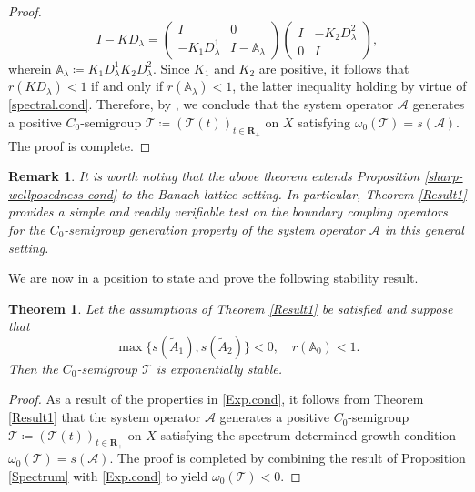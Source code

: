 \documentclass[a4paper,11pt,reqno]{amsart}
\def\A{{\mathbb{A}}}
\def\la{\lambda}
\def\calT{{\mathcal{T}}}
\def\calA{{\mathcal{A}}}
\def\R{\mathbf{R}}
\newtheorem{theorem}{Theorem}[section]
\theoremstyle{plain}
\newtheorem{remark}{Remark}[section]
\numberwithin{equation}{section}
\begin{document}
\begin{proof}
\begin{equation*}
I-K D_\la=\left( \begin{matrix}
I & 0\\
-K_1 D_\la^1 & I-\A_\la
\end{matrix}\right)\left(\begin{matrix}
I & -K_2 D_\la^2\\
0& I
\end{matrix}\right),
\end{equation*} 
wherein $\mathbb{A}_\lambda \coloneqq K_1 D_\lambda^1 K_2 D_\lambda^2$. Since $K_1$ and $K_2$ are positive, it follows that $r(K D_\la)<1$ if and only if $r(\mathbb{A}_\lambda)<1$, the latter inequality holding by virtue of \eqref{spectral.cond}. Therefore, by \cite[Theorem 1]{MR4711370}, we conclude that the system operator $\mathcal{A}$ generates a positive $C_0$-semigroup $\calT\coloneqq (\calT(t))_{t\in\R_+}$ on $X$ satisfying $\omega_0(\calT)=s(\mathcal{A})$. The proof is complete.
\end{proof}

\begin{remark}\label{test-remark2}
It is worth noting that the above theorem extends Proposition \ref{sharp-wellposedness-cond} to the Banach lattice setting. In particular, Theorem \ref{Result1} provides a simple and readily verifiable test on the boundary coupling operators for the $C_0$-semigroup generation property of the system operator $\calA$ in this general setting.
\end{remark}

We are now in a position to state and prove the following stability result.
\begin{theorem}\label{Result2}
Let the assumptions of Theorem \ref{Result1} be satisfied and suppose that
\begin{equation}\label{Exp.cond}
\max\{s(\tilde{A}_1),s(\tilde{A}_2)\}<0,\quad r(\A_0)<1.
\end{equation}
Then the $C_0$-semigroup $\calT$ is exponentially stable.
\end{theorem}
\begin{proof}
As a result of the properties in \eqref{Exp.cond}, it follows from Theorem \ref{Result1} that the system operator $\mathcal{A}$ generates a positive $C_0$-semigroup $\calT\coloneqq (\calT(t))_{t\in\R_+}$ on $X$ satisfying the spectrum-determined growth condition $\omega_0(\mathcal{T})=s(\mathcal{A})$. The proof is completed by combining the result of Proposition \ref{Spectrum} with \eqref{Exp.cond} to yield $\omega_0(\calT)<0$. 
\end{proof}
\end{document}

